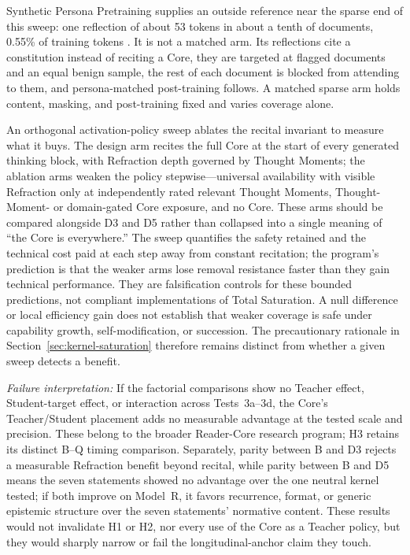 \documentclass[11pt]{article}
\begin{document}
Synthetic Persona Pretraining supplies an outside reference near the sparse
end of this sweep: one reflection of about 53 tokens in about a tenth of
documents, 0.55\% of training tokens \cite{minder2026spp}. It is not a matched
arm. Its reflections cite a constitution instead of reciting a Core, they are
targeted at flagged documents and an equal benign sample, the rest of each
document is blocked from attending to them, and persona-matched post-training
follows. A matched sparse arm holds content, masking, and post-training fixed
and varies coverage alone.

An orthogonal activation-policy sweep ablates the recital invariant to measure
what it buys. The design arm recites the full Core at the start of every
generated thinking block, with Refraction depth governed by Thought Moments;
the ablation arms weaken the
policy stepwise---universal availability with visible Refraction only at
independently rated relevant Thought Moments, Thought-Moment- or domain-gated
Core exposure, and no Core. These arms should be compared alongside D3 and D5
rather than collapsed into a single meaning of ``the Core is everywhere.'' The
sweep quantifies the safety retained and the technical cost paid at each step
away from constant recitation; the program's prediction is that the weaker
arms lose removal resistance faster than they gain technical performance. They
are falsification controls for these bounded predictions, not compliant
implementations of Total Saturation. A null difference or local efficiency gain
does not establish that weaker coverage is safe under capability growth,
self-modification, or succession. The precautionary rationale in
Section~\ref{sec:kernel-saturation} therefore remains distinct from whether a
given sweep detects a benefit.

\emph{Failure interpretation:} If the factorial comparisons show no Teacher
effect, Student-target effect, or interaction across Tests~3a--3d, the Core's
Teacher/Student placement adds no measurable advantage at the tested scale
and precision. These belong to the broader Reader-Core research program; H3 retains its
distinct B--Q timing comparison.
Separately, parity between B and D3 rejects a measurable Refraction benefit
beyond recital, while parity between B and D5 means the seven statements showed
no advantage over the one neutral kernel tested; if both improve on Model~R, it
favors recurrence, format, or generic epistemic structure over the seven
statements' normative content.
These results would not invalidate H1 or H2, nor every use of the Core as a
Teacher policy, but they would sharply narrow or fail the longitudinal-anchor
claim they touch.
\end{document}
